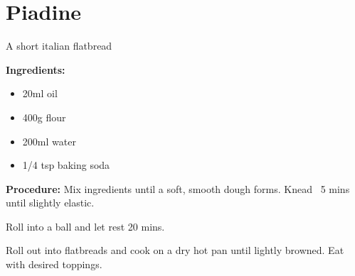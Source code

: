 \section{Piadine} %
A short italian flatbread %

\begin{multicols}{2}\raggedcolumns
\textbf{Ingredients:}

\begin{itemize}
	\item 20ml oil
	\item 400g flour
	\item 200ml water
	\item 1/4 tsp baking soda
\end{itemize}

%
%
\columnbreak

\textbf{Procedure:}
Mix ingredients until a soft, smooth dough forms. Knead ~5 mins until slightly elastic.

Roll into a ball and let rest 20 mins.

Roll out into flatbreads and cook on a dry hot pan until lightly browned. Eat with desired toppings.

\end{multicols}
